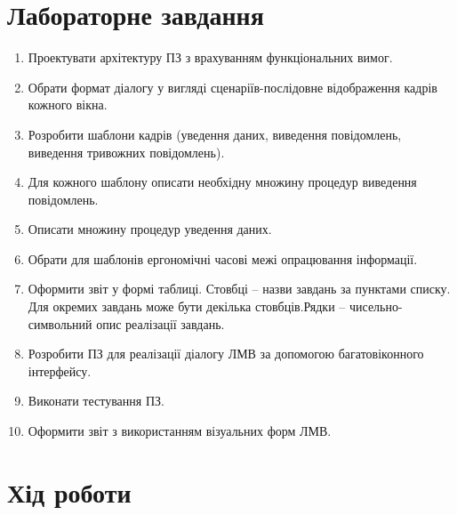 \documentclass[14pt]{extreport}
\begin{document}
\begin{normalsize}
  \section*{Лабораторне завдання}
  \begin{enumerate}
  	\item Проектувати архітектуру ПЗ з врахуванням функціональних вимог.
  \item Обрати формат діалогу у вигляді сценаріїв-послідовне відображення
кадрів кожного вікна.
  \item Розробити шаблони кадрів (уведення даних, виведення повідомлень,
виведення тривожних повідомлень).
  \item Для кожного шаблону описати необхідну множину процедур
виведення повідомлень.
  \item Описати множину процедур уведення даних.
  \item Обрати для шаблонів ергономічні часові межі опрацювання інформації.
  \item Оформити звіт у формі таблиці. Стовбці – назви завдань за пунктами списку. Для окремих завдань може бути декілька стовбців.Рядки – чисельно-символьний опис реалізації завдань.
  \item Розробити ПЗ для реалізації діалогу ЛМВ за допомогою багатовіконного інтерфейсу.
  \item Виконати тестування ПЗ.
  \item Оформити звіт з використанням візуальних форм ЛМВ.
  \end{enumerate}
  
  \section*{Хід роботи}
  

  \renewcommand{\tablename}{Таблиця}
  \renewcommand{\thetable}{\arabic{table}}
  \captionsetup[longtable]{justification=raggedleft, singlelinecheck=false, labelsep=period}


\end{normalsize}
\end{document}

